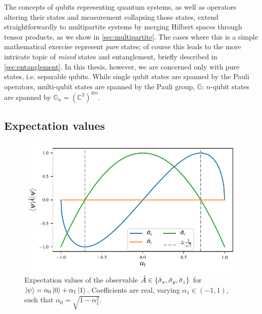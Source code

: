 The concepts of qubits representing quantum systems, as well as operators
    altering their states and measurement collapsing those states,
    extend straightforwardly to multipartite systems by merging Hilbert spaces through tensor products, 
    as we show in \cref{sec:multipartite}. 
The cases where this is a simple mathematical exercise represent \emph{pure} states;
    of course this leads to the more intricate topic of \emph{mixed} states and entanglement, 
    briefly described in \cref{sec:entanglement}.
In this thesis, however, we are concerned only with pure states, i.e. separable qubits.
While single qubit states are spanned by the Pauli operators, multi-qubit states are spanned by the Pauli group, $\mathbb{G}$: 
    $n$-qubit states are spanned by $\mathbb{G}_n = \left(\mathbb{C}^2\right)^{\otimes n}$.

\subsection{Expectation values}\label{sec:expectation_value}
\begin{figure}
    \begin{center}
        \includegraphics{contextual_review/figures/expectation_values.pdf}
    \end{center}
    \caption[Expectation values]{
        Expectation values of the observable $\hat{A} \in \{ \hat{\sigma}_{x}, \hat{\sigma}_{y}, \hat{\sigma}_{z}\}$ 
            for $\ket{\psi} = \alpha_0 \ket{0} + \alpha_1 \ket{1}$.
            Coefficients are real, varying $\alpha_1 \in \left( -1, 1\right)$, such that $\alpha_0 = \sqrt{1 - \alpha_1^2}$. 
    }
    \label{fig:expectation_values}
\end{figure}

